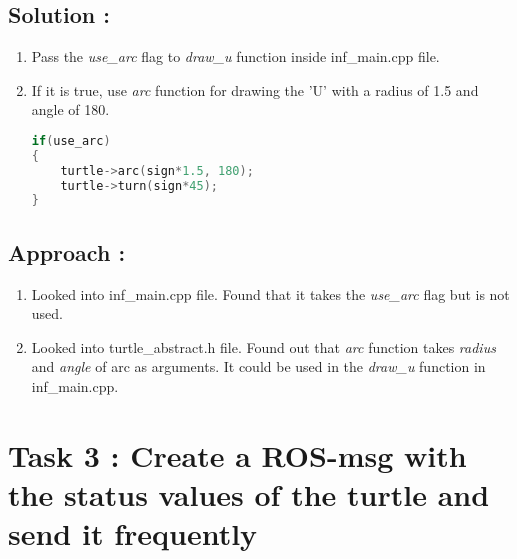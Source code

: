 \documentclass[12pt]{article}
\begin{document}

\subsection{Solution :}
\begin{enumerate}
\item Pass the \textit{use\_arc} flag to \textit{draw\_u} function inside inf\_main.cpp file.
\item If it is true, use \textit{arc} function for drawing the 'U' with a radius of 1.5 and angle of 180.
\begin{lstlisting}[language=c++]
if(use_arc)
{
    turtle->arc(sign*1.5, 180);
    turtle->turn(sign*45);
}
\end{lstlisting}
\end{enumerate}

\subsection{Approach :}
\begin{enumerate}
\item Looked into inf\_main.cpp file. Found that it takes the \textit{use\_arc} flag but is not used.
\item Looked into turtle\_abstract.h file. Found out that \textit{arc} function takes \textit{radius} and \textit{angle} of arc as arguments. It could be used in the \textit{draw\_u} function in inf\_main.cpp.
\end{enumerate}

\newpage


\section{Task 3 : Create a ROS-msg with the status values of the turtle and send it frequently}

\end{document}
